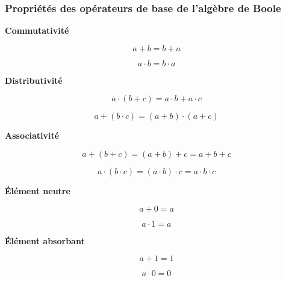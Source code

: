 \documentclass[11pt,oneside]{article}
\begin{document}
\subsubsection{Propriétés des opérateurs de base de l'algèbre de Boole}

\begin{prop}
\textbf{Commutativité}

\begin{minipage}[c]{.45\linewidth}
$$ a+b = b+a$$
\end{minipage}\hfill
\begin{minipage}[c]{.45\linewidth}
$$ a\cdot b = b\cdot a$$
\end{minipage}
\end{prop}


\begin{prop}
\textbf{Distributivité}

\begin{minipage}[c]{.45\linewidth}
$$ a\cdot (b+c) = a\cdot b+a \cdot c$$
\end{minipage}\hfill
\begin{minipage}[c]{.45\linewidth}
$$ a+(b\cdot c) = (a+b) \cdot (a+c)$$
\end{minipage}
\end{prop}

\begin{prop}
\textbf{Associativité}

\begin{minipage}[c]{.45\linewidth}
$$ a + (b+c) = (a+b)+c = a+b+c$$
\end{minipage}\hfill
\begin{minipage}[c]{.45\linewidth}
$$ a \cdot (b\cdot c) = (a\cdot b)\cdot c = a \cdot b\cdot c$$
\end{minipage}
\end{prop}

\begin{prop}
\textbf{Élément neutre}

\begin{minipage}[c]{.45\linewidth}
$$ a + 0 = a$$
\end{minipage}\hfill
\begin{minipage}[c]{.45\linewidth}
$$ a\cdot 1 = a$$
\end{minipage}
\end{prop}

\begin{prop}
\textbf{Élément absorbant}

\begin{minipage}[c]{.45\linewidth}
$$ a + 1 = 1$$
\end{minipage}\hfill
\begin{minipage}[c]{.45\linewidth}
$$ a\cdot 0 = 0$$
\end{minipage}
\end{prop}
\end{document}
